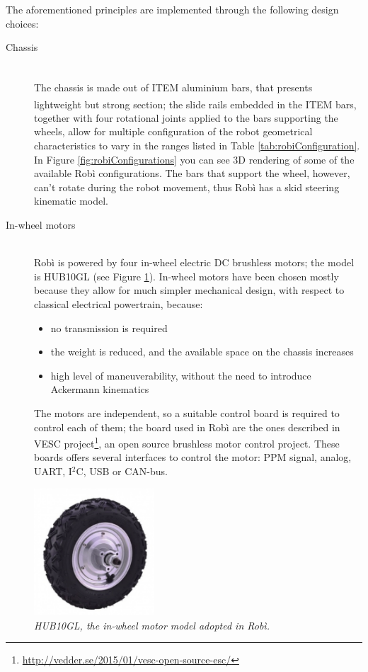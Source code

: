 The aforementioned principles are implemented through the following design choices:
\begin{description}
	\item[Chassis] \hfill \\ The chassis is made out of ITEM\textsuperscript{\textregistered} aluminium bars, that presents lightweight but strong section; the slide rails embedded in the ITEM\textsuperscript{\textregistered} bars, together with four rotational joints applied to the bars supporting the wheels, allow for multiple configuration of the robot geometrical characteristics to vary in the ranges listed in Table \ref{tab:robiConfiguration}. In Figure \ref{fig:robiConfigurations} you can see 3D rendering of some of the available Robì configurations. The bars that support the wheel, however, can't rotate during the robot movement, thus Robì has a skid steering kinematic model.
	
	\item[In-wheel motors] \hfill \\ Robì is powered by four in-wheel electric DC brushless motors; the model is HUB10GL (see Figure \ref{fig:robiMotori}). In-wheel motors have been chosen mostly because they allow for much simpler mechanical design, with respect to classical electrical powertrain, because:
	\begin{itemize}
		\item no transmission is required
		\item the weight is reduced, and the available space on the chassis increases
		\item high level of maneuverability, without the need to introduce Ackermann kinematics
	\end{itemize}
	The motors are independent, so a suitable control board is required to control each of them; the board used in Robì are the ones described in VESC project\footnote{\url{http://vedder.se/2015/01/vesc-open-source-esc/}},
an open source brushless motor control project. These boards offers several interfaces to control the motor:  PPM signal, analog, UART, I$^2$C, USB  or CAN-bus.
\end{description}

\begin{figure}
	\centering
	\includegraphics[width=0.4\textwidth]{Images/robi/motore.png}
	\caption{\textit{HUB10GL, the in-wheel motor model adopted in Robì.}}
	\label{fig:robiMotori}
\end{figure}

